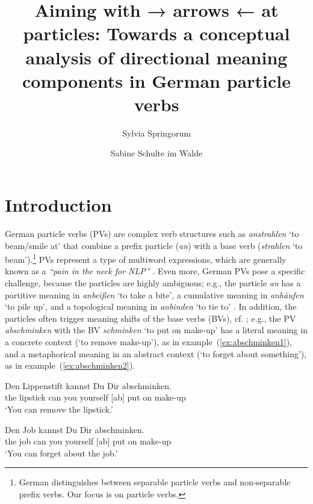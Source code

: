 \documentclass[output=paper]{langsci/langscibook}
\title{Aiming with → arrows ← at
  particles: Towards a conceptual analysis of directional meaning
  components in German particle verbs}
\author{%
  Sylvia Springorum\affiliation{Institut für Maschinelle Sprachverarbeitung, Universität Stuttgart}\and 
  Sabine Schulte im Walde\affiliation{Institut für Maschinelle Sprachverarbeitung, Universität Stuttgart}
}
\begin{document}
\maketitle


\clearpage
\section{Introduction}

German particle verbs (PVs) are complex verb structures such as
\textit{anstrahlen} `to beam/smile at' that combine a prefix particle
(\textit{an}) with a base verb (\textit{strahlen} `to
beam').\footnote{German distinguishes between separable particle verbs
  and non-separable prefix verbs. Our focus is on particle verbs.} PVs
represent a type of multiword expressions, which are generally known
as a \textit{``pain in the neck for NLP''} \citep{SagEtAl:02}. Even
more, German PVs pose a specific challenge, because the particles are
highly ambiguous; e.g., the particle \textit{an} has a partitive
meaning in \textit{anbeißen} `to take a bite', a cumulative meaning in
\textit{anhäufen} `to pile up', and a topological meaning in
\textit{anbinden} `to tie to' \citep{Springorum:11}. In addition, the
particles often trigger meaning shifts of the base verbs (BVs),
cf. \citet{SpringorumEtAl:13,FrassinelliEtAl:17,Koeper/SchulteImWalde:18,SchulteImWaldeEtAl:18};
e.g., the PV \textit{abschminken} with the BV \textit{schminken} `to
put on make-up' has a literal meaning in a concrete context (`to
remove make-up'), as in example~(\ref{ex:abschminken1}), and a
metaphorical meaning in an abstract context (`to forget about
something'), as in example~(\ref{ex:abschminken2}).

\ea\label{ex:abschminken1}
\gll Den Lippenstift kannst Du Dir abschminken.\\
the lipstick can you yourself {[ab] put on make-up}\\
\glt `You can remove the lipstick.'
\z

\ea\label{ex:abschminken2}
\gll Den Job kannst Du Dir abschminken.\\
the job can you yourself {[ab] put on make-up}\\
\glt `You can forget about the job.'
\z

%
\end{document}
